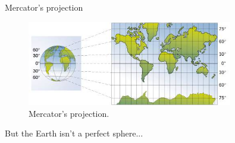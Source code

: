\documentclass[10pt]{beamer}
\begin{document}
\begin{frame}{Mercator's projection}
  \begin{figure}[H]
    \centering
    \includegraphics[width=0.8\textwidth]{images/mercator.jpg}
    \caption{Mercator's projection.}
\end{figure}
But the Earth isn't a perfect sphere...
\end{frame}
\end{document}

